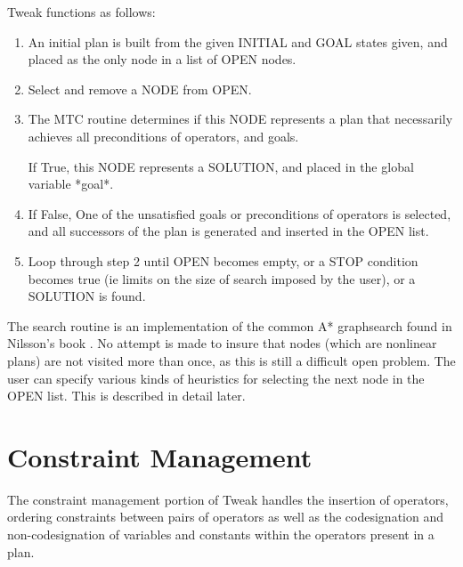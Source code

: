 Tweak functions as follows:
\begin{enumerate}
\item An initial plan is built from the given INITIAL and GOAL states given, and placed as the only node in a list of OPEN nodes.

\item Select and remove a NODE from OPEN.

\item The MTC routine determines if this NODE represents a plan that necessarily achieves all preconditions of operators, and goals. 

If True, this NODE represents a SOLUTION, and placed in the global variable *goal*.

\item If False, One of the unsatisfied goals or preconditions of operators is selected, and all successors of the plan is generated and inserted in the OPEN list.

\item Loop through step 2 until OPEN becomes empty, or a STOP condition becomes true (ie limits on the size of search imposed by the user), or a SOLUTION is found.
\end{enumerate}

The search routine is an implementation of the common A* graphsearch
found in Nilsson's book \cite{nilsson}.  
No attempt is made to insure that nodes (which are nonlinear plans) are not visited more than once, as this is still a  difficult open problem.  The user can specify various kinds of heuristics for selecting the next node in the OPEN list.  This is described in detail later.

\section{Constraint Management}
The constraint management portion of Tweak handles the insertion of operators, ordering constraints between pairs of operators as well as the codesignation and non-codesignation of variables and constants within the operators present in a plan.  

